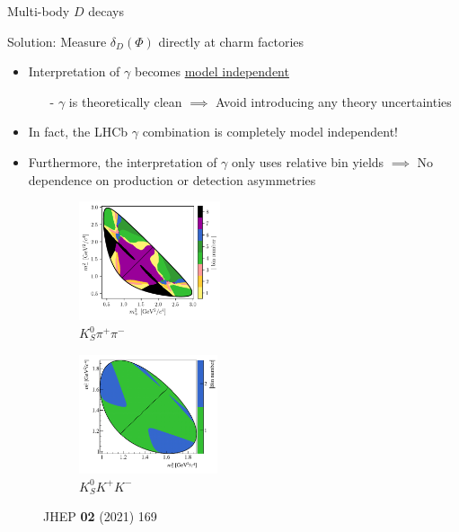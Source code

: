 \documentclass[dvipsnames]{beamer}
\begin{document}
\begin{frame}{Multi-body $D$ decays}
  \begin{center}
    {\large Solution: Measure $\delta_D(\Phi)$ directly at charm factories}
  \end{center}
  \begin{itemize}
    \setlength\itemsep{0.5em}
    \item{Interpretation of $\gamma$ becomes \underline{model independent}}
    \begin{itemize}
      \item[-]{$\gamma$ is theoretically clean $\implies$ Avoid introducing any theory uncertainties}
    \end{itemize}
    \item{In fact, the LHCb $\gamma$ combination is completely model independent!}
    \item{Furthermore, the interpretation of $\gamma$ only uses relative bin yields $\implies$ No dependence on production or detection asymmetries}
  \end{itemize}
  \begin{figure}
    \centering
    \begin{subfigure}{0.5\textwidth}
      \centering
      \includegraphics[height = 3.5cm]{Plots/KsPiPi_optimal.png}
      \vspace{-0.3cm}
      \caption*{$K_S^0\pi^+\pi^-$}
    \end{subfigure}%
    \begin{subfigure}{0.5\textwidth}
      \centering
      \includegraphics[height = 3.5cm]{Plots/KsKK_binning.png}
      \vspace{-0.3cm}
      \caption*{$K_S^0K^+K^-$}
    \end{subfigure}
    \vspace{-0.9cm}
    \caption*{\tiny JHEP \textbf{02} (2021) 169}
  \end{figure}
\end{frame}
\end{document}
